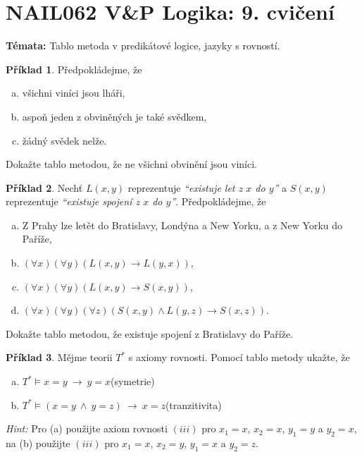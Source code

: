 \documentclass[a4paper]{article}
\theoremstyle{plain}
\theoremstyle{definition}
\newtheorem{problem}{Příklad}
\begin{document}
\section*{NAIL062 V\&P Logika: 9. cvičení}


\textbf{Témata:}
Tablo metoda v predikátové logice, jazyky s rovností.


\medskip\begin{problem}
    Předpokládejme, že
    \begin{enumerate}[(a)]
    \item všichni viníci jsou lháři,
    \item aspoň jeden z obviněných je také svědkem,
    \item žádný svědek nelže.
    \end{enumerate}
    Dokažte tablo metodou, že ne všichni obvinění jsou viníci.
\end{problem} 
    
    
    
\medskip\begin{problem} Nechť $L(x,y)$ reprezentuje \emph{``existuje let z $x$ do $y$''} a $S(x,y)$ reprezentuje \emph{``existuje spojení z $x$ do $y$''}. Předpokládejme, že
    \begin{enumerate}[(a)]
    \itemsep6pt
    \item Z Prahy lze letět do Bratislavy, Londýna a New Yorku, a z New Yorku do Paříže,
    \item $(\forall x)(\forall y)(L(x,y) \to L(y,x))$,
    \item $(\forall x)(\forall y)(L(x,y)\to S(x,y))$,
    \item $(\forall x)(\forall y)(\forall z)(S(x,y)\wedge L(y,z)\to S(x,z))$.
    \end{enumerate}
    Dokažte tablo metodou, že existuje spojení z Bratislavy do Paříže.
\end{problem} 


\medskip\begin{problem} Mějme teorii $T^*$ s axiomy rovnosti. Pomocí tablo metody ukažte, že 
\begin{enumerate}[(a)]
    \itemsep6pt
    \item $T^*\models x=y\ \to\ y=x$\hfill(symetrie)
    \item $T^*\models (x=y\ \wedge\ y=z)\ \to\ x=z$\hfill(tranzitivita)
\end{enumerate}
{\it Hint:} Pro (a) použijte axiom rovnosti $(iii)$ pro $x_1=x$, $x_2=x$, $y_1=y$ a $y_2=x$, \newline
    na (b) použijte $(iii)$ pro $x_1=x$, $x_2=y$, $y_1=x$ a $y_2=z$.
\end{problem} 
\end{document}
